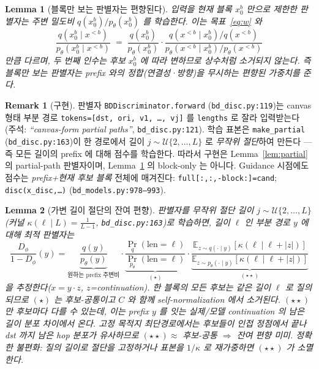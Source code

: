 \documentclass[11pt]{article}
\newcommand{\code}[1]{\texttt{\small #1}}
\newcommand{\xpre}{x^{<b}}        %
\newcommand{\xblk}{x^{b}}         %
\newcommand{\pth}{p_\theta}
\newcommand{\Dphi}{D_\phi}
\theoremstyle{plain}
\newtheorem{lemma}{Lemma}
\theoremstyle{definition}
\newtheorem{remark}{Remark}
\begin{document}
\begin{lemma}[블록만 보는 판별자는 편향된다]\label{lem:blockonly}
입력을 현재 블록 $\xblk_0$ 만으로 제한한 판별자는 \emph{주변} 밀도비
$q(\xblk_0)/\pth(\xblk_0)$ 를 학습한다. 이는 목표~\eqref{eq:w} 와
\begin{equation}
\frac{q(\xblk_0\mid\xpre)}{\pth(\xblk_0\mid\xpre)}
\;=\;\frac{q(\xblk_0)}{\pth(\xblk_0)}\cdot
\frac{q(\xpre\mid\xblk_0)/q(\xpre)}{\pth(\xpre\mid\xblk_0)/\pth(\xpre)}
\end{equation}
만큼 다르며, 두 번째 인수는 \emph{후보 $\xblk_0$ 에 따라 변하므로} 상수처럼 소거되지 않는다.
즉 블록만 보는 판별자는 prefix 와의 정합(연결성·방향)을 무시하는 편향된 가중치를 준다.
\end{lemma}

\begin{remark}[구현]
판별자 \code{BDDiscriminator.forward} (\code{bd\_disc.py:119})는 canvas 형태
부분 경로 \code{tokens=[dst, ori, v1, \dots, vj]} 를 \code{lengths} 로 잘라 입력받는다
(주석: \emph{``canvas-form partial paths''}, \code{bd\_disc.py:121}).
학습 표본은 \code{make\_partial} (\code{bd\_disc.py:163})이 한 경로에서
길이 $j\sim \mathcal{U}\{2,\dots,L\}$ 로 \emph{무작위 절단}하여 만든다 — 즉 모든 길이의
prefix 에 대해 점수를 학습한다. 따라서 구현은 Lemma~\ref{lem:partial} 의
partial-path 판별자이며, Lemma~\ref{lem:blockonly} 의 block-only 는 아니다.
Guidance 시점에도 점수는 \emph{prefix+현재 후보 블록} 전체에 매겨진다:
\code{full[:,:,-block:]=cand}; \code{disc(x\_disc,\dots)} (\code{bd\_models.py:978--993}).
\end{remark}

\begin{lemma}[가변 길이 절단의 잔여 편향]\label{lem:trunc}
판별자를 무작위 절단 길이 $j\sim\mathcal U\{2,\dots,L\}$(커널 $\kappa(\ell\mid L)=\tfrac{1}{L-1}$,
\code{bd\_disc.py:163})로 학습하면, 길이 $\ell$ 인 부분 경로 $y$ 에 대해 최적 판별자는
\begin{equation}
\frac{\Dphi}{1-\Dphi}(y)
=\underbrace{\frac{q(y)}{\pth(y)}}_{\text{원하는 prefix 주변비}}
\cdot\underbrace{\frac{\Pr_q(\mathrm{len}{=}\ell)}{\Pr_{\pth}(\mathrm{len}{=}\ell)}}_{(\star)}
\cdot\underbrace{\frac{\mathbb E_{z\sim q(\cdot\mid y)}[\kappa(\ell\mid \ell+|z|)]}
{\mathbb E_{z\sim \pth(\cdot\mid y)}[\kappa(\ell\mid \ell+|z|)]}}_{(\star\star)}
\end{equation}
을 추정한다($x=y\cdot z$, $z$=continuation). 한 블록의 모든 후보는 같은 길이 $\ell$ 로 질의되므로
$(\star)$ 는 후보-공통이고 $C$ 와 함께 self-normalization 에서 소거된다.
$(\star\star)$ 만 후보마다 다를 수 있는데, 이는 prefix $y$ 를 잇는 실제/모델 continuation 의
\emph{남은 길이 분포} 차이에서 온다. 고정 목적지 최단경로에서는 후보들이 인접 정점에서 끝나
dst 까지 남은 hop 분포가 유사하므로 $(\star\star)\approx$ 후보-공통 $\Rightarrow$ 잔여 편향 미미.
\emph{정확한 불편화}: 질의 길이로 절단을 고정하거나 표본을 $1/\kappa$ 로 재가중하면 $(\star\star)$ 가 소멸한다.
\end{lemma}
\end{document}
